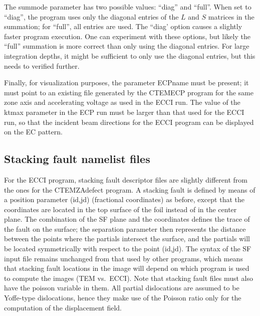 \documentclass[DIV=calc, paper=letter, fontsize=11pt]{scrartcl}	 %
\begin{document}
The \textsf{summode} parameter has two possible values: ``diag'' and ``full''.  When set to ``diag'', the program uses only the diagonal 
entries of the $L$ and $S$ matrices in the summation; for ``full'', all entries are used.  The ``diag' option causes a slightly faster
program execution.  One can experiment with these options, but likely the ``full'' summation is more correct than only using the diagonal 
entries.  For large integration depths, it might be sufficient to only use the diagonal entries, but this needs to verified further.

Finally, for visualization purposes, the parameter \textsf{ECPname} must be present; it must point to an existing file generated by the 
\textsf{CTEMECP} program for the same zone axis and accelerating voltage as used in the ECCI run.  The value of the \textsf{ktmax}
parameter in the ECP run must be larger than that used for the ECCI run, so that the incident beam directions for the ECCI program 
can be displayed on the EC pattern.

\subsection{Stacking fault namelist files}
For the ECCI program, stacking fault descriptor files are slightly different from the ones for the \textsf{CTEMZAdefect} program.
A stacking fault is defined by means of a position parameter \textsf{(id,jd)} (fractional coordinates) as before, except that the 
coordinates are located in the top surface of the foil instead of in the center plane.  The combination of the SF plane and the coordinates defines the trace of the 
fault on the surface; the separation parameter then represents the distance between the points where the partials intersect the 
surface, and the partials will be located symmetrically with respect to the point \textsf{(id,jd)}.  The syntax of the SF input file
remains unchanged from that used by other programs, which means that stacking fault locations in the image will depend on which 
program is used to compute the images (TEM vs.\ ECCI).  Note that stacking fault files must also have the \textsf{poisson} variable in
them.  All partial dislocations are assumed to be Yoffe-type dislocations, hence they make use of the Poisson ratio only for the computation
of the displacement field.
\end{document}
